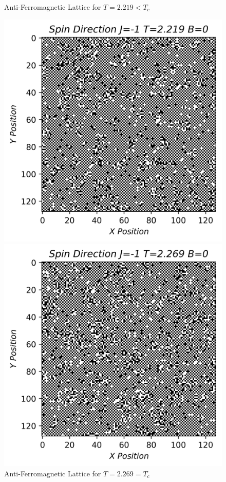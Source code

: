 \documentclass[twocolumn]{article}
\begin{document}
\begin{figure}[H]
\caption{Anti-Ferromagnetic Lattice for $T=2.219<T_c$}
\centering
\includegraphics[scale=.55]{AntiFerro1T=2219}
\caption{Anti-Ferromagnetic Lattice for $T=2.269=T_c$}
\centering
\includegraphics[scale=.55]{AntiFerro2T=2269}

\end{figure}
\end{document}
